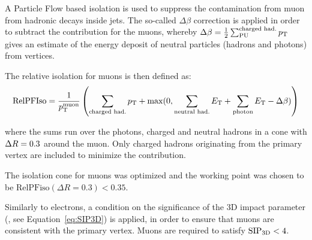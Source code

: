 A Particle Flow based isolation is used to suppress the contamination from muon from hadronic decays inside jets.
The so-called $\Delta\beta$ correction is applied in order to subtract the \pileup{} contribution for the muons, 
whereby $\Delta\beta = \frac{1}{2} \sum^\text{charged had.}_\text{PU} p_{\mathrm{T}}$
gives an estimate of the energy deposit of neutral particles (hadrons and photons) from \pileup{} vertices.

The relative isolation for muons is then defined as:
\begin{equation}
\text{RelPFIso} = \frac{1}{p_{\mathrm{T}}^\text{muon}} \left( \sum_\text{charged had.} p_{\mathrm{T}} + \max(0, \sum_\text{neutral had.} E_{\mathrm{T}} + \sum_\text{photon} E_{\mathrm{T}} - \Delta \beta) \right)
\label{eqn:mupfiso}
\end{equation}

where the sums run over the photons, charged and neutral hadrons in a cone with $\Delta R = 0.3$ around the muon.
Only charged hadrons originating from the primary vertex are included to minimize the \pileup{} contribution.

The isolation cone for muons was optimized and the working point was chosen to be $\text{RelPFiso}(\Delta R = 0.3) < 0.35$.

Similarly to electrons, a condition on the significance of the 3D impact parameter (\SIPthreeD, see Equation~\ref{eq:SIP3D}) is applied,
in order to ensure that muons are consistent with the primary vertex.
Muons are required to satisfy $\mathrm{SIP}_{\mathrm{3D}} < 4$.
